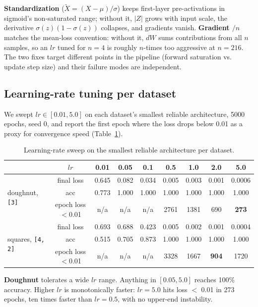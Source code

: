 \documentclass[10pt, a4paper]{article}
\begin{document}
\textbf{Standardization} (\(\tilde X = (X - \mu)/\sigma\)) keeps first-layer pre-activations in sigmoid's non-saturated range; without it, \(|Z|\) grows with input scale, the derivative \(\sigma(z)(1-\sigma(z))\) collapses, and gradients vanish. \textbf{Gradient \(/n\)} matches the mean-loss convention: without it, \(dW\) sums contributions from all \(n\) samples, so an \(lr\) tuned for \(n=4\) is roughly \(n\)-times too aggressive at \(n=216\). The two fixes target different points in the pipeline (forward saturation vs. update step size) and their failure modes are independent.

\subsection{Learning-rate tuning per dataset}

We swept \(lr \in [0.01, 5.0]\) on each dataset's smallest reliable architecture, 5000 epochs, seed 0, and report the first epoch where the loss drops below 0.01 as a proxy for convergence speed (Table~\ref{tab:lr}).

\begin{table}[h]
\centering
\caption{Learning-rate sweep on the smallest reliable architecture per dataset.}
\label{tab:lr}
\begin{tabular}{lcccccccc}
\toprule
& \(lr\) & 0.01 & 0.05 & 0.1 & 0.5 & 1.0 & 2.0 & 5.0 \\
\midrule
\multirow{3}{*}{doughnut, \texttt{[3]}}
& final loss      & 0.645 & 0.082 & 0.034 & 0.005 & 0.003 & 0.001 & 0.0006 \\
& acc             & 0.773 & 1.000 & 1.000 & 1.000 & 1.000 & 1.000 & 1.000 \\
& epoch loss\(<\)0.01 & n/a   & n/a   & n/a   & 2761  & 1381  & 690   & \textbf{273} \\
\midrule
\multirow{3}{*}{squares, \texttt{[4, 2]}}
& final loss      & 0.693 & 0.688 & 0.423 & 0.005 & 0.002 & 0.001 & 0.0004 \\
& acc             & 0.515 & 0.705 & 0.873 & 1.000 & 1.000 & 1.000 & 1.000 \\
& epoch loss\(<\)0.01 & n/a   & n/a   & n/a   & 3328  & 1667  & \textbf{904}   & 1720 \\
\bottomrule
\end{tabular}
\end{table}

\textbf{Doughnut} tolerates a wide \(lr\) range. Anything in \([0.05, 5.0]\) reaches 100\% accuracy. Higher \(lr\) is monotonically faster: \(lr=5.0\) hits loss \(<\) 0.01 in 273 epochs, ten times faster than \(lr=0.5\), with no upper-end instability.
\end{document}
